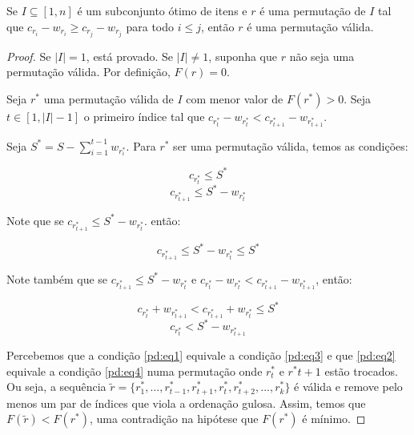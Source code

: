 \begin{theo} \label{pd:proof}
Se $I \subseteq [1, n]$ é um subconjunto ótimo de itens e $r$ é uma permutação de $I$ tal que $c_{r_i} - w_{r_i} \geq c_{r_j} - w_{r_j}$ para todo $i \leq j$, então $r$ é uma permutação válida.
\end{theo}
\begin{proof}
Se $|I| = 1$, está provado. Se $|I| \neq 1$, suponha que $r$ não seja uma permutação válida. Por definição, $F(r) = 0$.

Seja $r^*$ uma permutação válida de $I$ com menor valor de $F(r^*) > 0$. Seja $t \in [1, |I| - 1]$ o primeiro índice tal que $c_{r^*_t} - w_{r^*_t} < c_{r^*_{t + 1}} - w_{r^*_{t + 1}}$.

Seja $S^* = S - \sum_{i = 1}^{t - 1} w_{r^*_i}$. Para $r^*$ ser uma permutação válida, temos as condições:

\begin{equation}\label{pd:eq1}
  c_{r^*_t} \leq S^*
\end{equation}
\begin{equation}\label{pd:eq2}
  c_{r^*_{t + 1}} \leq S^* - w_{r^*_t}
\end{equation}

Note que se $c_{r^*_{t + 1}} \leq S^* - w_{r^*_t}$. então:

\begin{equation}\label{pd:eq3}
  c_{r^*_{t + 1}} \leq S^* - w_{r^*_t} \leq S^*
\end{equation}

Note também que se $c_{r^*_{t + 1}} \leq S^* - w_{r^*_t}$ e $c_{r^*_t} - w_{r^*_t} < c_{r^*_{t + 1}} - w_{r^*_{t + 1}}$, então: 

$$c_{r^*_{t}} + w_{r^*_{t + 1}} < c_{r^*_{t + 1}} + w_{r^*_t} \leq S^*$$
\begin{equation}\label{pd:eq4}
  c_{r^*_{t}} < S^* - w_{r^*_{t + 1}}
\end{equation}

Percebemos que a condição \ref{pd:eq1} equivale a condição \ref{pd:eq3} e que \ref{pd:eq2} equivale a condição \ref{pd:eq4} numa permutação onde $r^*_t$ e $r^*{t + 1}$ estão trocados. Ou seja, a sequência $\widetilde{r} = \{r^*_1, ..., r^*_{t - 1}, r^*_{t + 1}, r^*_t, r^*_{t + 2}, ..., r^*_k\}$ é válida e remove pelo menos um par de índices que viola a ordenação gulosa. Assim, temos que $F(\widetilde{r}) < F(r^*)$, uma contradição na hipótese que $F(r^*)$ é mínimo.
\end{proof}


